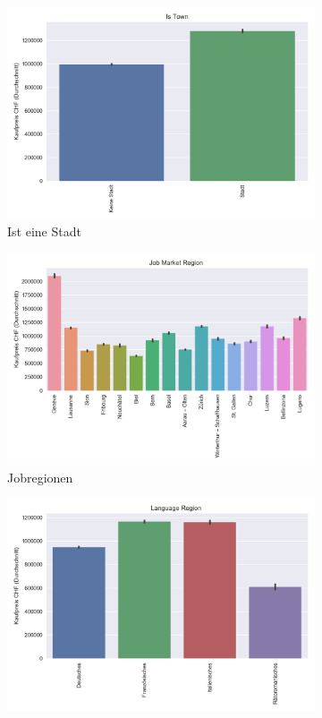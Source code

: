 \begin{figure}[h]
\begin{subfigure}{.5\textwidth}
  \includegraphics[width=\linewidth]{images/anhang/analysis/barplot_is_town.png}
  \caption{Ist eine Stadt}
\end{subfigure}
\begin{subfigure}{.5\textwidth}
  \centering
  \includegraphics[width=\linewidth]{images/anhang/analysis/barplot_job_market_region_id.png}
  \caption{Jobregionen}
\end{subfigure}
\begin{subfigure}{.5\textwidth}
  \centering
  \includegraphics[width=\linewidth]{images/anhang/analysis/barplot_language_region_id.png}

\end{subfigure}
\end{figure}
